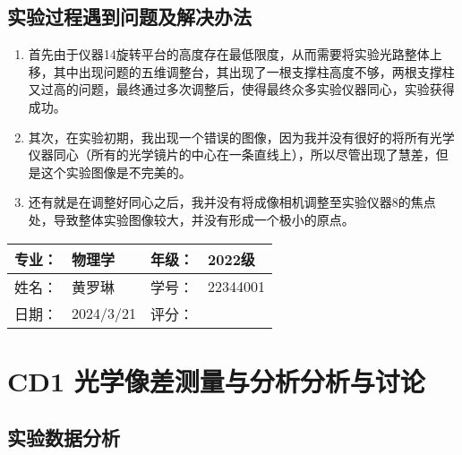 \documentclass[dvipsnames, svgnames,a4paper,11pt]{article}
\begin{document}
	
	\subsection{实验过程遇到问题及解决办法}
	\begin{enumerate}
		\item 首先由于仪器14旋转平台的高度存在最低限度，从而需要将实验光路整体上移，其中出现问题的五维调整台，其出现了一根支撑柱高度不够，两根支撑柱又过高的问题，最终通过多次调整后，使得最终众多实验仪器同心，实验获得成功。
		\item 其次，在实验初期，我出现一个错误的图像，因为我并没有很好的将所有光学仪器同心（所有的光学镜片的中心在一条直线上），所以尽管出现了慧差，但是这个实验图像是不完美的。
		\item 还有就是在调整好同心之后，我并没有将成像相机调整至实验仪器8的焦点处，导致整体实验图像较大，并没有形成一个极小的原点。
		
		
		
	

	
	\end{enumerate}
	
	
	
	\clearpage
	
	\begin{table}
		\renewcommand\arraystretch{1.7}
		\begin{tabularx}{\textwidth}{|X|X|X|X|}
			\hline
			专业：& 物理学 &年级：& 2022级\\
			\hline
			姓名： &  黄罗琳& 学号：&22344001 \\
			\hline
			日期：& 2024/3/21 & 评分： &   \\
			\hline
		\end{tabularx}
	\end{table}
	
	\section{CD1 光学像差测量与分析\quad\heiti 分析与讨论}
	
	\subsection{实验数据分析}
	
\end{document}
